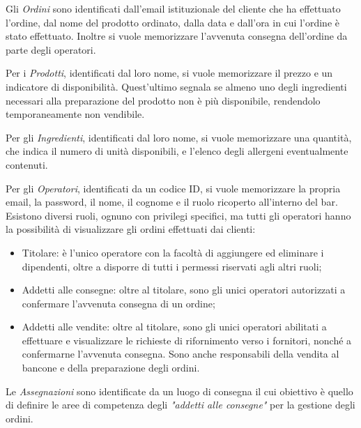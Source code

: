 \documentclass[12pt,a4paper]{article}
\begin{document}
    \vspace{8pt}
    \noindent
    Gli \textit{Ordini} sono identificati dall'email istituzionale del cliente che ha effettuato l'ordine, dal nome del prodotto ordinato, dalla data e dall'ora in cui l'ordine è stato effettuato. Inoltre si vuole memorizzare l'avvenuta consegna dell'ordine da parte degli operatori.
    
    \vspace{8pt}
    \noindent
    Per i \textit{Prodotti}, identificati dal loro nome, si vuole memorizzare il prezzo e un indicatore di disponibilità. Quest'ultimo segnala se almeno uno degli ingredienti necessari alla preparazione del prodotto non è più disponibile, rendendolo temporaneamente non vendibile.

    \vspace{8pt}
    \noindent
    Per gli \textit{Ingredienti},  identificati dal loro nome, si vuole memorizzare una quantità, che indica il numero di unità disponibili, e l'elenco degli allergeni eventualmente contenuti.

    \vspace{8pt}
    \noindent
    Per gli \textit{Operatori}, identificati da un codice ID, si vuole memorizzare la propria email, la password, il nome, il cognome e il ruolo ricoperto all'interno del bar.\\
    Esistono diversi ruoli, ognuno con privilegi specifici, ma tutti gli operatori hanno la possibilità di visualizzare gli ordini effettuati dai clienti:
    \begin{itemize}[leftmargin=1em]
        \item Titolare: è l'unico operatore con la facoltà di aggiungere ed eliminare i dipendenti, oltre a disporre di tutti i permessi riservati agli altri ruoli;
        \item Addetti alle consegne: oltre al titolare, sono gli unici operatori autorizzati a confermare l'avvenuta consegna di un ordine;
        \item Addetti alle vendite: oltre al titolare, sono gli unici operatori abilitati a effettuare e visualizzare le richieste di rifornimento verso i fornitori, nonché a confermarne l'avvenuta consegna. Sono anche responsabili della vendita al bancone e della preparazione degli ordini.
    \end{itemize}

    \vspace{8pt}
    \noindent
    Le \textit{Assegnazioni} sono identificate da un luogo di consegna il cui obiettivo è quello di definire le aree di competenza degli \textit{"addetti alle consegne"} per la gestione degli ordini.
\end{document}
